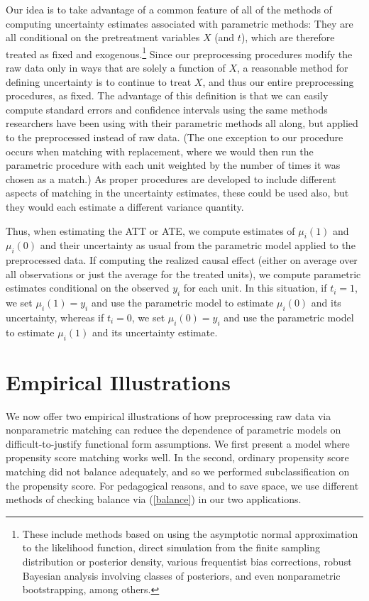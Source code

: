 \documentclass[11pt,titlepage]{article}
\begin{document}
Our idea is to take advantage of a common feature of all of the
methods of computing uncertainty estimates associated with parametric
methods: They are all conditional on the pretreatment variables $X$
(and $t$), which are therefore treated as fixed and
exogenous.\footnote{These include methods based on using the
  asymptotic normal approximation to the likelihood function, direct
  simulation from the finite sampling distribution or posterior
  density, various frequentist bias corrections, robust Bayesian
  analysis involving classes of posteriors, and even nonparametric
  bootstrapping, among others.}  Since our preprocessing procedures
modify the raw data only in ways that are solely a function of $X$, a
reasonable method for defining uncertainty is to continue to treat
$X$, and thus our entire preprocessing procedures, as fixed.  The
advantage of this definition is that we can easily compute standard
errors and confidence intervals using the same methods researchers
have been using with their parametric methods all along, but applied
to the preprocessed instead of raw data.  (The one exception to our
procedure occurs when matching with replacement, where we would then
run the parametric procedure with each unit weighted by the number of
times it was chosen as a match.)  As proper procedures are developed
to include different aspects of matching in the uncertainty estimates,
these could be used also, but they would each estimate a different
variance quantity.

Thus, when estimating the ATT or ATE, we compute estimates of
$\mu_i(1)$ and $\mu_i(0)$ and their uncertainty as usual from the
parametric model applied to the preprocessed data.  If computing the
realized causal effect (either on average over all observations or
just the average for the treated units), we compute parametric
estimates conditional on the observed $y_i$ for each unit.  In this
situation, if $t_i=1$, we set $\mu_i(1)=y_i$ and use the parametric
model to estimate $\mu_i(0)$ and its uncertainty, whereas if $t_i=0$,
we set $\mu_i(0)=y_i$ and use the parametric model to estimate
$\mu_i(1)$ and its uncertainty estimate.

\section{Empirical Illustrations}\label{s:emp}

We now offer two empirical illustrations of how preprocessing raw data
via nonparametric matching can reduce the dependence of parametric
models on difficult-to-justify functional form assumptions.  We first
present a model where propensity score matching works well.  In the
second, ordinary propensity score matching did not balance adequately,
and so we performed subclassification on the propensity score.  For
pedagogical reasons, and to save space, we use different methods of
checking balance via (\ref{balance}) in our two applications.
\end{document}
